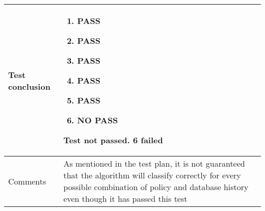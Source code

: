 \documentclass[10pt]{article}
\begin{document}
\begin{center}
\begin{longtable}{ | p{4cm} | p{10cm} | }
			Test conclusion & 	\begin{enumerate}
							\item PASS
							\item PASS
							\item PASS
							\item PASS
							\item PASS
							\item NO PASS
						\end{enumerate}
						Test not passed. 6 failed \\  [3pt] \hline
			Comments & As mentioned in the test plan, it is not guaranteed that the algorithm will classify correctly for every possible combination of policy and database history even though it has passed this test
					\\ [3pt] \hline
		\end{longtable}
	\end{center}
\end{document}
